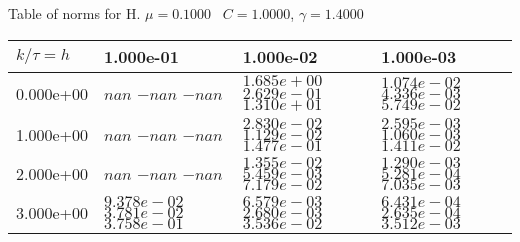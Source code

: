 \begin{center}
Table of norms for H. $\mu = 0.1000$ \, $C = 1.0000$, $\gamma = 1.4000$
  
\begin{tabular}{|p{1in}|p{1in}|p{1in}|p{1in}|} \hline
$k / \tau = h$ &1.000e-01 &1.000e-02 &1.000e-03 \\ \hline 
0.000e+00 & $nan$  $-nan$  $-nan$  & $1.685e+00$  $2.629e-01$  $1.310e+01$  & $1.074e-02$  $4.336e-03$  $5.749e-02$  \\ \hline 
1.000e+00 & $nan$  $-nan$  $-nan$  & $2.830e-02$  $1.129e-02$  $1.477e-01$  & $2.595e-03$  $1.060e-03$  $1.411e-02$  \\ \hline 
2.000e+00 & $nan$  $-nan$  $-nan$  & $1.355e-02$  $5.459e-03$  $7.179e-02$  & $1.290e-03$  $5.281e-04$  $7.035e-03$  \\ \hline 
3.000e+00 & $9.378e-02$  $3.781e-02$  $3.758e-01$  & $6.579e-03$  $2.680e-03$  $3.536e-02$  & $6.431e-04$  $2.635e-04$  $3.512e-03$  \\ \hline 

\end{tabular}\\[20pt]
\end{center}

